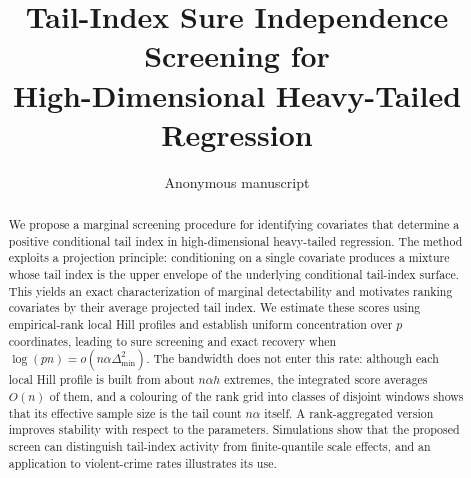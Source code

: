 \documentclass[11pt]{article}
\title{Tail-Index Sure Independence Screening for\\High-Dimensional Heavy-Tailed Regression}
\author{Anonymous manuscript}\date{}
\theoremstyle{remark}\newtheorem{remark}[theorem]{Remark}
\begin{document}
\maketitle
\begin{abstract} We propose a marginal screening procedure for identifying covariates that determine a positive conditional tail index in high-dimensional heavy-tailed regression. The method exploits a projection principle: conditioning on a single covariate produces a mixture whose tail index is the upper envelope of the underlying conditional tail-index surface. This yields an exact characterization of marginal detectability and motivates ranking covariates by their average projected tail index. We estimate these scores using empirical-rank local Hill profiles and establish uniform concentration over $p$ coordinates, leading to sure screening and exact recovery when $\log(pn)=o(n\alpha\Delta_{\min}^2)$. The bandwidth does not enter this rate: although each local Hill profile is built from about $n\alpha h$ extremes, the integrated score averages $O(n)$ of them, and a colouring of the rank grid into classes of disjoint windows shows that its effective sample size is the tail count $n\alpha$ itself. A rank-aggregated version improves stability with respect to the parameters. Simulations show that the proposed screen can distinguish tail-index activity from finite-quantile scale effects, and an application to violent-crime rates illustrates its use. 
\end{abstract}




\FloatBarrier

\FloatBarrier

\appendix


\end{document}
